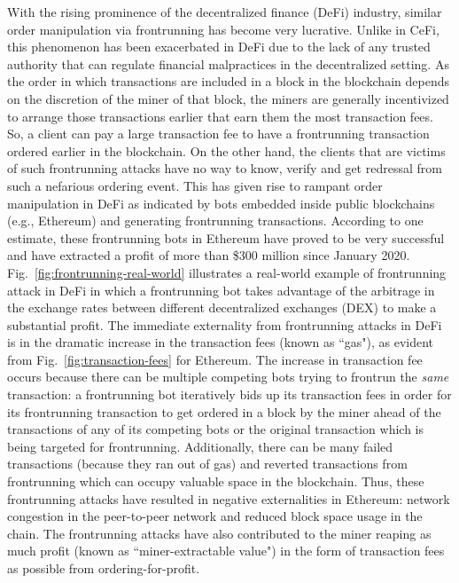 \documentclass{article}
\begin{document}
With the rising prominence of the decentralized finance (DeFi) industry, similar order manipulation via frontrunning has become very lucrative. Unlike in CeFi, this phenomenon has been exacerbated in DeFi due to the lack of any trusted authority that can regulate financial malpractices in the decentralized setting. As the order in which transactions are included in a block in the blockchain depends on the discretion of the miner of that block, the miners are generally incentivized to arrange those transactions earlier that earn them the most transaction fees. So, a client can pay a large transaction fee to have a frontrunning transaction ordered earlier in the blockchain. On the other hand, the clients that are victims of such frontrunning attacks have no way to know, verify and get redressal from such a nefarious ordering event. This has given rise to  rampant order manipulation in DeFi as indicated by  bots embedded inside public blockchains (e.g., {\sf Ethereum}) and generating frontrunning transactions. According to one estimate, these frontrunning bots in {\sf Ethereum} have proved to be very successful and have extracted a profit of more than \$300 million since January 2020. Fig.~\ref{fig:frontrunning-real-world} illustrates a real-world example of frontrunning attack in DeFi in which a frontrunning bot takes advantage of the arbitrage in the exchange rates between different decentralized exchanges (DEX) to make a substantial profit. The immediate externality from frontrunning attacks in DeFi is in the dramatic increase in the transaction fees (known as ``gas"), as evident from Fig.~\ref{fig:transaction-fees} for {\sf Ethereum}. The increase in transaction fee occurs because there can be multiple competing bots trying to frontrun the {\em same} transaction: a frontrunning bot  iteratively bids up its transaction fees in order for its frontrunning transaction to get ordered in a block by the miner ahead of the transactions  of any of its competing bots or the original transaction which is being targeted for frontrunning. Additionally, there can be many failed transactions (because they ran out of gas) and reverted transactions from frontrunning which can occupy valuable space in the blockchain. Thus, these frontrunning attacks have resulted in negative externalities in {\sf Ethereum}:  network congestion in the peer-to-peer network and reduced block space usage in the chain.   The frontrunning attacks have also contributed to the miner reaping as much profit (known as ``miner-extractable value") in the form of transaction fees as possible from ordering-for-profit. 
 
\end{document}
